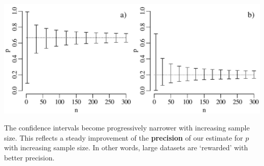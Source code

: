 \noindent\begin{minipage}[t][][b]{.65\textwidth}
  \includegraphics[width=\textwidth]{../figures/binomcivsn.pdf}\\
\end{minipage}
\begin{minipage}[t][][t]{.35\textwidth}
  \label{fig:binomcivsn}
\end{minipage}

The confidence intervals become progressively narrower with increasing
sample size. This reflects a steady improvement of the
\textbf{precision} of our estimate for $p$ with increasing sample
size. In other words, large datasets are `rewarded' with better
precision.
